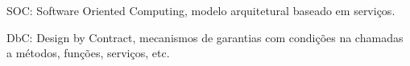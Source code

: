 {}

\newcommand{\acrlista}[1]{\vspace{12pt}\noindent #1}

\acrlista{SOC: {Software Oriented Computing}, modelo arquitetural baseado em
serviços.}

\acrlista{DbC: {Design by Contract}, mecanismos de garantias com condições na
chamadas a métodos, funções, serviços, etc.}

\pagebreak
